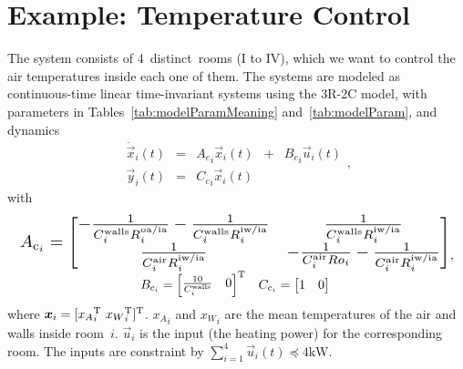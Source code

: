 \documentclass{ifacconf}  %
\begin{document}
\section{Example: Temperature Control}\label{sec:App_dMPC}
The system consists of $4$~distinct~rooms (I to IV), which we want to control the air temperatures inside each one of them.
The systems are modeled as continuous-time linear \mbox{time-invariant} systems using the \mbox{3R-2C} model, with parameters in Tables~\ref{tab:modelParamMeaning} and~\ref{tab:modelParam}, and dynamics
\begin{equation}
\begin{matrix}
  \label{eq:systems_cont}
\dot{\vec{x}}_{i}(t)&=&{A_{c}}_{i}\vec{x}_{i}(t) &+& {B_{c}}_{i}\vec{u}_{i}(t)\\
\vec{y}_{i}(t)&=&{C_{c}}_{i}\vec{x}_{i}(t) &&
\end{matrix},
\end{equation}
with
\begin{equation*}
  \label{eq:room_system}
  \begin{matrix}
\resizebox{.98\columnwidth}{!}{$
  A_{\mathrm{c}_{i}}=\left[
    \begin{matrix}
      -\frac{1}{C^{\text{walls}}_{i}R^{\text{oa/ia}}_{i}}-\frac{1}{C^{\text{walls}}_{i}R^{\text{iw/ia}}_{i}}& \frac{1}{C^{\text{walls}}_{i}R^{\text{iw/ia}}_{i}}\\
      \frac{1}{C^{\text{air}}_{i}R^{\text{iw/ia}}_{i}} &-\frac{1}{C^{\text{air}}_{i}Ro_{i}}-\frac{1}{C^{\text{air}}_{i}R^{\text{iw/ia}}_{i}}
    \end{matrix}\right]
    $}
  \\
  \begin{matrix}
    B_{\mathrm{c}_{i}}=\left[
      \begin{matrix}  \frac{10}{C^{\text{walls}}_{i}}& 0\end{matrix}
    \right]\T&C_{\mathrm{c}_{i}}=\left[\begin{matrix}1 & 0\end{matrix}\right]
  \end{matrix}
  \end{matrix},
\end{equation*}
where ${\vec{x}_{i}=[{{x}_{A}}_{i}\T\ {{x}_{W}}_{i}\T]\T}$. ${x_A}_i$ and ${x_W}_i$ are the mean temperatures of the air and walls inside room~$i$. $\vec{u}_{i}$ is the input (the heating power)
for the corresponding room. The inputs are constraint by ${\sum_{i=1}^{4}\vec{u}_{i}(t)\preceq 4\mathrm{kW}}$.
\end{document}
